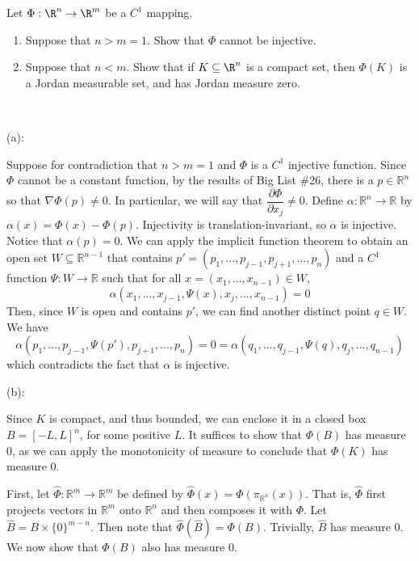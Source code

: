 \documentclass{../../../tex-setup/eh-homework}
\begin{document}
    \begin{question}{34}
        Let $\Phi:\R^n\rightarrow\R^m$ be a $C^1$ mapping.
        \begin{enumerate}[label=(\alph*)]
            \item Suppose that $n>m = 1$. Show that $\Phi$ cannot be injective.
            
            \item Suppose that $n<m$. Show that if $K\subseteq\R^n$ is a compact set, then $\Phi(K)$ is a Jordan measurable set, and has Jordan measure zero.
        \end{enumerate}
        \tcblower
        \ 
        
        (a):

        Suppose for contradiction that \(n > m = 1\) and \(\Phi\) is a \(C^1\) injective function. Since \(\Phi\) cannot be a constant function, by the results of Big List \#26, there is a \(p \in \mathbb{R}^n\) so that \(\nabla \Phi(p) \neq 0\). In particular, we will say that \(\dfrac{\partial \Phi}{\partial x_j} \neq 0\). Define \(\alpha : \mathbb{R}^n \to \mathbb{R}\) by \(\alpha (x) = \Phi (x) - \Phi (p)\). Injectivity is translation-invariant, so \(\alpha\) is injective. Notice that \(\alpha (p) = 0\). We can apply the implicit function theorem to obtain an open set \(W \subseteq \mathbb{R}^{n-1}\) that contains \(p' = (p_1, ..., p_{j-1}, p_{j+1}, ..., p_n)\) and a \(C^1\) function \(\Psi : W \to \mathbb{R}\) such that for all \(x = (x_1, ..., x_{n-1}) \in W\),
        \[
            \alpha (x_1, ..., x_{j-1}, \Psi (x), x_{j}, ..., x_{n-1}) = 0
        \]
        Then, since \(W\) is open and contains \(p'\), we can find another distinct point \(q \in W\). We have
        \[
            \alpha (p_1, ..., p_{j-1}, \Psi (p'), p_{j+1}, ..., p_n) = 0 = \alpha (q_1, ..., q_{j-1}, \Psi (q), q_{j}, ..., q_{n-1})
        \]
        which contradicts the fact that \(\alpha\) is injective.

        \medskip

        (b):

        Since \(K\) is compact, and thus bounded, we can enclose it in a closed box \(B = [-L, L]^n\), for some positive \(L\). It suffices to show that \(\Phi (B)\) has measure 0, as we can apply the monotonicity of measure to conclude that \(\Phi (K)\) has measure 0.

        First, let \(\hat{\Phi}: \mathbb{R}^m \to \mathbb{R}^m\) be defined by \(\hat{\Phi}(x) = \Phi (\pi _{\mathbb{R}^n}(x))\). That is, \(\hat{\Phi}\) first projects vectors in \(\mathbb{R}^m\) onto \(\mathbb{R}^n\) and then composes it with \(\Phi\). Let \(\hat{B} = B \times \{ 0 \}^{m-n}\). Then note that \(\hat{\Phi}(\hat{B}) = \Phi (B)\). Trivially, \(\hat{B}\) has measure 0. We now show that \(\Phi (B)\) also has measure 0.


\end{question}
\end{document}

